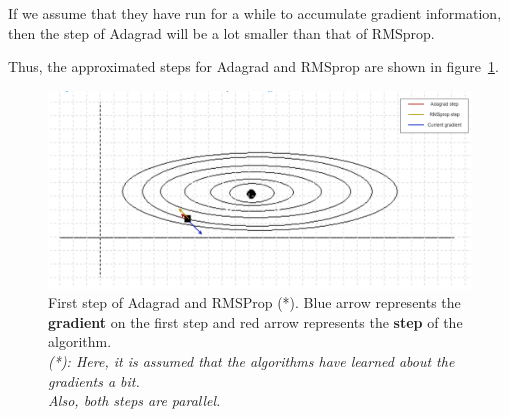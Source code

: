 If we assume that they have run for a while to accumulate gradient
information, then the step of Adagrad will be a lot smaller than that of RMSprop.

Thus, the approximated steps for Adagrad and RMSprop are shown in figure~\ref{fig:prob9_contour_adagrad_rmsprop}.

\begin{figure}[H]
	\centering
	\includegraphics[width=.7\textwidth]{../Problem 9/contour_adagrad_rmsprop.png}
	\caption{First step of Adagrad and RMSProp (*). Blue arrow represents the \textbf{gradient} on the first step and red arrow represents the \textbf{step} of the algorithm.\\
	\textit{\small(*): Here, it is assumed that the algorithms have learned about the gradients a bit.\\ Also, both steps are parallel.}
	}
	\label{fig:prob9_contour_adagrad_rmsprop}
\end{figure}
\vspace{3mm}